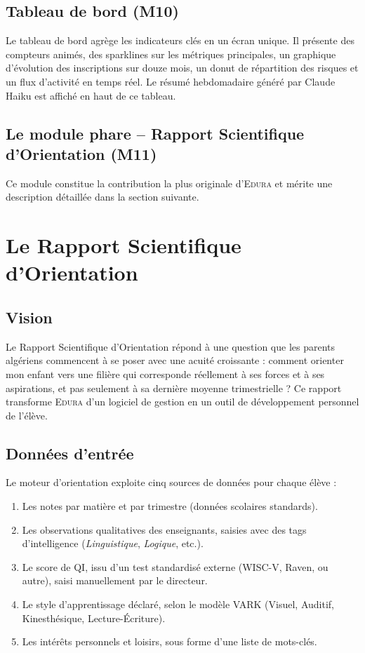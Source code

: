 \documentclass[12pt,a4paper,oneside]{report}
\newcommand{\edura}{\textsc{Edura}}
\begin{document}
\subsection{Tableau de bord (M10)}

Le tableau de bord agrège les indicateurs clés en un écran unique. Il présente des compteurs animés, des sparklines sur les métriques principales, un graphique d'évolution des inscriptions sur douze mois, un donut de répartition des risques et un flux d'activité en temps réel. Le résumé hebdomadaire généré par Claude Haiku est affiché en haut de ce tableau.

\subsection{Le module phare -- Rapport Scientifique d'Orientation (M11)}

Ce module constitue la contribution la plus originale d'\edura{} et mérite une description détaillée dans la section suivante.

\section{Le Rapport Scientifique d'Orientation}

\subsection{Vision}

Le Rapport Scientifique d'Orientation répond à une question que les parents algériens commencent à se poser avec une acuité croissante : comment orienter mon enfant vers une filière qui corresponde réellement à ses forces et à ses aspirations, et pas seulement à sa dernière moyenne trimestrielle ? Ce rapport transforme \edura{} d'un logiciel de gestion en un outil de développement personnel de l'élève.

\subsection{Données d'entrée}

Le moteur d'orientation exploite cinq sources de données pour chaque élève :
\begin{enumerate}
  \item Les notes par matière et par trimestre (données scolaires standards).
  \item Les observations qualitatives des enseignants, saisies avec des tags d'intelligence (\textit{Linguistique}, \textit{Logique}, etc.).
  \item Le score de QI, issu d'un test standardisé externe (WISC-V, Raven, ou autre), saisi manuellement par le directeur.
  \item Le style d'apprentissage déclaré, selon le modèle VARK (Visuel, Auditif, Kinesthésique, Lecture-Écriture).
  \item Les intérêts personnels et loisirs, sous forme d'une liste de mots-clés.
\end{enumerate}
\end{document}
